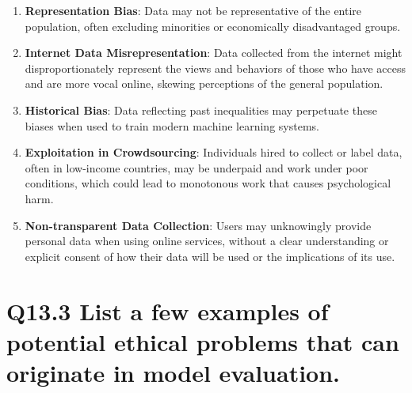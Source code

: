 \documentclass[11pt]{article}
\begin{document}
\begin{enumerate}
    \item \textbf{Representation Bias}: Data may not be representative of the entire population, often excluding minorities or economically disadvantaged groups.
    \item \textbf{Internet Data Misrepresentation}: Data collected from the internet might disproportionately represent the views and behaviors of those who have access and are more vocal online, skewing perceptions of the general population.
    \item \textbf{Historical Bias}: Data reflecting past inequalities may perpetuate these biases when used to train modern machine learning systems.
    \item \textbf{Exploitation in Crowdsourcing}: Individuals hired to collect or label data, often in low-income countries, may be underpaid and work under poor conditions, which could lead to monotonous work that causes psychological harm.
    \item \textbf{Non-transparent Data Collection}: Users may unknowingly provide personal data when using online services, without a clear understanding or explicit consent of how their data will be used or the implications of its use.
  \end{enumerate}
  
\section{Q13.3 List a few examples of potential ethical problems that can originate in model evaluation.}
\end{document}
